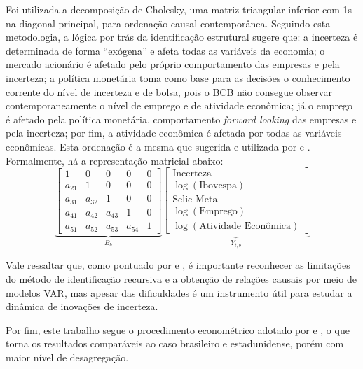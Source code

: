 Foi utilizada a decomposição de Cholesky, uma matriz triangular inferior com 1s na diagonal principal, para ordenação causal contemporânea.
Seguindo esta metodologia, a lógica por trás da identificação estrutural sugere que: a incerteza é determinada de forma ``exógena'' e afeta todas as variáveis da economia; o mercado acionário é afetado pelo próprio comportamento das empresas e pela incerteza; a política monetária toma como base para as decisões o conhecimento corrente do nível de incerteza e de bolsa, pois o \gls{BCB} não consegue observar contemporaneamente o nível de emprego e de atividade econômica; já o emprego é afetado pela política monetária, comportamento \textit{forward looking} das empresas e pela incerteza; por fim, a atividade econômica é afetada por todas as variáveis econômicas. Esta ordenação é a mesma que sugerida e utilizada por  e . Formalmente, há a representação matricial abaixo:
$$ 
\underbrace{ 
\begin{bmatrix}
1       & 0       & 0       & 0         & 0 \\
a_{21}  & 1       & 0       & 0         & 0 \\
a_{31}  & a_{32}  & 1       & 0         & 0 \\
a_{41}  & a_{42}  & a_{43}  & 1         & 0 \\
a_{51}  & a_{52}  & a_{53}  & a_{54}    & 1
\end{bmatrix}}_{B_{b}}
\underbrace{ 
\begin{bmatrix}
\text{Incerteza} \\
\log(\text{Ibovespa}) \\
\text{Selic Meta} \\
\log(\text{Emprego})\\
\log(\text{Atividade Econômica})
\end{bmatrix}}_{Y_{t,b}}
$$
\par

Vale ressaltar que, como pontuado por  e , é importante reconhecer as limitações do método de identificação recursiva e a obtenção de relações causais por meio de modelos \gls{VAR}, mas apesar das dificuldades é um instrumento útil para estudar a dinâmica de inovações de incerteza.
\par

Por fim, este trabalho segue o procedimento econométrico adotado por  e , o que torna os resultados comparáveis ao caso brasileiro e estadunidense, porém com maior nível de desagregação. %

